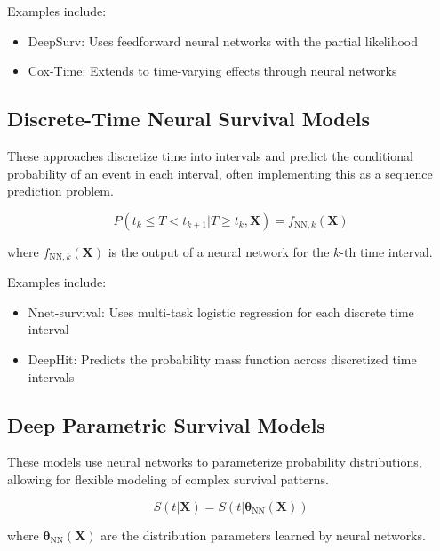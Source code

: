 Examples include:
\begin{itemize}
    \item DeepSurv: Uses feedforward neural networks with the partial likelihood
    \item Cox-Time: Extends to time-varying effects through neural networks
\end{itemize}

\subsection{Discrete-Time Neural Survival Models}

These approaches discretize time into intervals and predict the conditional probability of an event in each interval, often implementing this as a sequence prediction problem.

\begin{equationbox}[title=Discrete-Time Survival Models]
\begin{equation}
P(t_k \leq T < t_{k+1} | T \geq t_k, \mathbf{X}) = f_{\text{NN},k}(\mathbf{X})
\end{equation}

where $f_{\text{NN},k}(\mathbf{X})$ is the output of a neural network for the $k$-th time interval.
\end{equationbox}

Examples include:
\begin{itemize}
    \item Nnet-survival: Uses multi-task logistic regression for each discrete time interval
    \item DeepHit: Predicts the probability mass function across discretized time intervals
\end{itemize}

\subsection{Deep Parametric Survival Models}

These models use neural networks to parameterize probability distributions, allowing for flexible modeling of complex survival patterns.

\begin{equationbox}[title=Deep Parametric Survival Models]
\begin{equation}
S(t|\mathbf{X}) = S(t|\boldsymbol{\theta}_{\text{NN}}(\mathbf{X}))
\end{equation}

where $\boldsymbol{\theta}_{\text{NN}}(\mathbf{X})$ are the distribution parameters learned by neural networks.
\end{equationbox}

